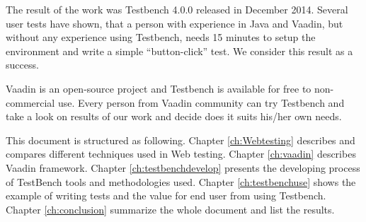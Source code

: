 	  The result of the work was Testbench 4.0.0 released in December 2014.
	  Several user tests have shown, that a person with experience in Java and
	  Vaadin, but without any experience using Testbench, needs 15 minutes to setup
	  the environment and write a simple ``button-click'' test. We consider this
	  result as a success.
	  
	  Vaadin is an open-source project and Testbench is available for free to
	  non-commercial use.  Every person from Vaadin community
	  can try Testbench and take a look on results of our work and
	  decide does it suits his/her own needs.
	  
	  \iffalse
		  I will also , because Testbench is focused on testing Web
		 applications written with Vaadin. I will also describe the working flow, what
		 tools and methodologies the team used and how the final product helps
		 Vaadin developers.
	  \fi

	  This document is structured as following. Chapter \ref{ch:Webtesting}
	  describes and compares different techniques used in Web testing.
	  Chapter \ref{ch:vaadin} describes Vaadin framework.
	  Chapter \ref{ch:testbenchdevelop} presents the developing process of
	  TestBench tools and methodologies used. Chapter \ref{ch:testbenchuse} shows the example of writing tests and the value for
	  end user from using Testbench. Chapter \ref{ch:conclusion} summarize the whole
	  document and list the results.